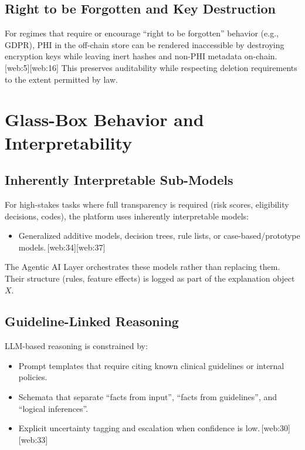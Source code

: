 \documentclass[11pt]{article}
\begin{document}
\subsection{Right to be Forgotten and Key Destruction}

For regimes that require or encourage ``right to be forgotten'' behavior (e.g., GDPR), PHI in the off-chain store can be rendered inaccessible by destroying encryption keys while leaving inert hashes and non-PHI metadata on-chain.\,[web:5][web:16] 
This preserves auditability while respecting deletion requirements to the extent permitted by law.

\section{Glass-Box Behavior and Interpretability}

\subsection{Inherently Interpretable Sub-Models}

For high-stakes tasks where full transparency is required (risk scores, eligibility decisions, codes), the platform uses inherently interpretable models:
\begin{itemize}[nosep]
  \item Generalized additive models, decision trees, rule lists, or case-based/prototype models.\,[web:34][web:37]
\end{itemize}

The Agentic AI Layer orchestrates these models rather than replacing them. 
Their structure (rules, feature effects) is logged as part of the explanation object $X$.

\subsection{Guideline-Linked Reasoning}

LLM-based reasoning is constrained by:
\begin{itemize}[nosep]
  \item Prompt templates that require citing known clinical guidelines or internal policies.
  \item Schemata that separate ``facts from input'', ``facts from guidelines'', and ``logical inferences''.
  \item Explicit uncertainty tagging and escalation when confidence is low.\,[web:30][web:33]
\end{itemize}
\end{document}
